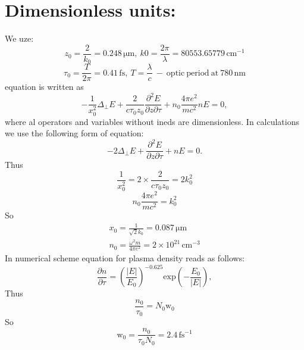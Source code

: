 \documentclass{article}
\newcommand{\dd}{\partial}
\newcommand{\ff}{\frac}
\begin{document}
\section{Dimensionless units:}
We uze:
\[ z_0=\ff{2}{k_0}=0.248\,\mathrm{\mu m}, \ k0=\ff{2\pi}{\lambda}=80553.65779\,\mathrm{cm}^{-1} \]
\[ \tau_0=\ff{T}{2\pi}=0.41\,\mathrm{fs}, \ T=\ff{\lambda}{c} \mathrm{\ - \ optic \ period \ at \ 780 \, nm} \]
equation is written as
\begin{equation}
- \ff{1}{x_0^2}\Delta_\perp E +\ff{2}{c \tau_0 z_0}\ff{\dd^2 E}{\dd z \dd \tau} + n_0 \ff{4\pi e^2}{m c^2} n E = 0,
\end{equation}
where al operators and variables without ineds are dimensionless.
In calculations we use the following form of equation:
\[ - 2 \Delta_\perp E +\ff{\dd^2 E}{\dd z \dd \tau} + n E = 0. \]
Thus
\[  \ff{1}{x_0^2}=2 \times \ff{2}{c \tau_0 z_0} = 2 k_0^2 \]
\[ n_0 \ff{4\pi e^2}{m c^2}=k_0^2 \]
So
\begin{eqnarray}
x_0=\ff{1}{\sqrt{2}k_0}=0.087\,\mathrm{\mu m} \\
n_0=\ff{\omega^2 m}{4 \pi e^2}=2\times10^{21}\,\mathrm{cm^{-3}}
\end{eqnarray}
In numerical scheme equation for plasma density reads as follows:
\[ \ff{\dd n}{\dd \tau} = \left(\ff{\left|E\right|}{E_0}\right)^{-0.625} \mathrm{exp}\left(-\ff{E_0}{\left|E\right|}\right), \]
Thus
\[ \ff{n_0}{\tau_0}=N_0 \mathrm{w_0} \]
So
\[ \mathrm{w_0} = \ff{n_0}{\tau_0 N_0} = 2.4\,\mathrm{fs^{-1}} \]
\end{document}
